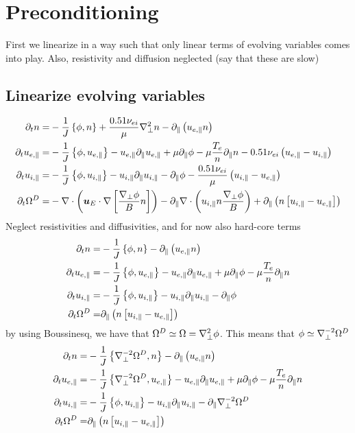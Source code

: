 \section{Preconditioning}
%
First we linearize in a way such that only linear terms of evolving variables comes into play.
Also, resistivity and diffusion neglected (say that these are slow)

\subsection{Linearize evolving variables}
%
\begin{align*}
 \partial_t n
 =&
 -\frac{1}{J}\L\{\phi,n\R\}
 +\frac{0.51\nu_{ei}}{\mu} \grad_\perp^2 n
 -\partial_\| \L(u_{e,\|}n\R)
\\
%
%
%
\partial_t u_{e,\|}
 =&
 -\frac{1}{J}\L\{\phi,u_{e,\|}\R\}
 - u_{e,\|} \partial_\| u_{e,\|}
 + \mu \partial_\| \phi
 - \mu \frac{T_e }{n}\partial_\|   n
 - 0.51 \nu_{ei} \L(u_{e,\|}-u_{i,\|}\R)
\\
%
%
%
\partial_t u_{i,\|}
 =&
 -\frac{1}{J}\L\{\phi,u_{i,\|}\R\}
 - u_{i,\|} \partial_\| u_{i,\|}
 - \partial_\|\phi
 - \frac{ 0.51 \nu_{ei} }{ \mu } \L(u_{i,\|}-u_{e,\|}\R)
\\
%
%
%
  \partial_t \Om^D
  =&
  - \div \L( \ve{u}_E\cdot\nabla \L[\frac{\grad_\perp \phi}{B}n \R] \R)
  - \partial_\|\div \L( u_{i,\|}n \frac{\grad_\perp \phi}{B}\R)
 + \partial_\| \L(n\L[ u_{i,\|} - u_{e,\|} \R]\R)
\end{align*}
%
Neglect resistivities and diffusivities, and for now also hard-core terms
%
\begin{align*}
 \partial_t n
 =&
 -\frac{1}{J}\L\{\phi,n\R\}
 -\partial_\| \L(u_{e,\|}n\R)
\\
%
%
%
\partial_t u_{e,\|}
 =&
 -\frac{1}{J}\L\{\phi,u_{e,\|}\R\}
 - u_{e,\|} \partial_\| u_{e,\|}
 + \mu \partial_\| \phi
 - \mu \frac{T_e}{n}\partial_\|  n
\\
%
%
%
\partial_t u_{i,\|}
 =&
 -\frac{1}{J}\L\{\phi,u_{i,\|}\R\}
 - u_{i,\|} \partial_\| u_{i,\|}
 - \partial_\|\phi
\\
%
%
%
  \partial_t \Om^D
  =&
  \partial_\| \L(n\L[ u_{i,\|} - u_{e,\|} \R]\R)
\end{align*}
%
by using Boussinesq, we have that $\Omega^D\simeq\Omega=\nabla_\perp^2\phi$.
This means that $\phi\simeq\nabla_\perp^{-2}\Omega^D$
%
\begin{align*}
 \partial_t n
 =&
 -\frac{1}{J}\L\{\grad_\perp^{-2}\Om^D,n\R\}
 -\partial_\| \L(u_{e,\|}n\R)
\\
%
%
%
\partial_t u_{e,\|}
 =&
 -\frac{1}{J}\L\{\grad_\perp^{-2}\Om^D,u_{e,\|}\R\}
 - u_{e,\|} \partial_\| u_{e,\|}
 + \mu \partial_\| \phi
 - \mu \frac{T_e  }{n}\partial_\|  n
\\
%
%
%
\partial_t u_{i,\|}
 =&
 -\frac{1}{J}\L\{\phi,u_{i,\|}\R\}
 - u_{i,\|} \partial_\| u_{i,\|}
 - \partial_\|\grad_\perp^{-2}\Om^D
\\
%
%
%
  \partial_t \Om^D
  =&
  \partial_\| \L(n\L[ u_{i,\|} - u_{e,\|} \R]\R)
\end{align*}
